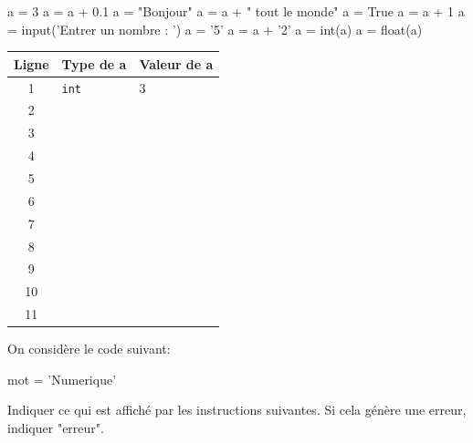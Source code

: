 \documentclass[a4paper,10pt]{report}
\renewcommand{\arraystretch}{1}  %
\def\ptsexoD{3}
\begin{document}
\begin{minipage}{0.49\linewidth}

\begin{CodePythontexAlt}[TaillePolice=\large,Largeur=1\linewidth,Centre,PremLigne=1]{}
a = 3
a = a + 0.1
a = "Bonjour"
a = a + " tout le monde"
a = True
a = a + 1
a = input('Entrer un nombre : ')
a = '5'
a = a + '2'
a = int(a)
a = float(a)

\end{CodePythontexAlt}

\end{minipage}\hfill
\begin{minipage}{0.46\linewidth}
    
    \medskip

    \renewcommand{\arraystretch}{1.2}
    \begin{tabular}{|c|p{2cm}|p{5cm}|}
        \hline
        Ligne& Type de a & Valeur de a\\ \hline
        1& \verb|int|&3\\\hline
        2&&\\\hline
        3&&\\\hline
        4&&\\\hline
        5&&\\\hline
        6&&\\\hline
        7&&\\\hline
        8&&\\\hline
        9&&\\\hline
        10&&\\\hline
        11&&\\\hline


    \end{tabular}
\end{minipage}


\pagebreak
\pagestyle{DS_LP}
\exods{\ptsexoD}

On considère le code suivant:

\begin{CodePythontexAlt}[TaillePolice=\large,Largeur=1\linewidth,Centre,PremLigne=1]{}
mot = 'Numerique'
\end{CodePythontexAlt}


Indiquer ce qui est affiché par les instructions suivantes. Si cela génère une erreur, indiquer "erreur".
\end{document}
